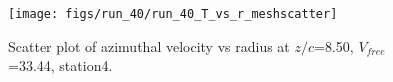 \begin{figure}[H]
\centering
\texttt{[image: figs/run\_40/run\_40\_T\_vs\_r\_meshscatter]}
\caption{Scatter plot of azimuthal velocity vs radius at $z/c$=8.50, $V_{free}$=33.44, station4.}
\label{fig:run_40_T_vs_r_meshscatter}
\end{figure}


